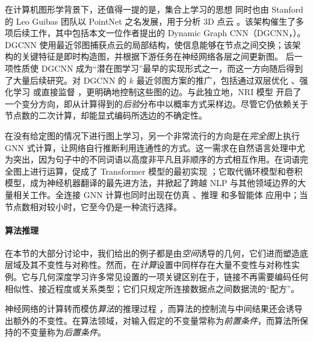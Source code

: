 在计算机图形学背景下，还值得一提的是，集合上学习的思想 \citep{zaheer2017deep} 同时也由 Stanford 的 Leo Guibas 团队以 PointNet 之名发展，用于分析 3D 点云 \citep{qi2017pointnet}。该架构催生了多项后续工作，其中包括本文一位作者提出的 Dynamic Graph CNN（DGCNN，\cite{wang2019dynamic}）。DGCNN 使用最近邻图捕获点云的局部结构，使信息能够在节点之间交换；该架构的关键特征是即时构造图，并根据下游任务在神经网络各层之间更新图。
%
后一项性质使 DGCNN 成为“潜在图学习”最早的实现形式之一，而这一方向随后得到了大量后续研究。对 DGCNN 的 $k$ 最近邻图方案的推广，包括通过双层优化 \citep{franceschi2019learning}、强化学习 \citep{kazi2020differentiable} 或直接监督 \citep{velivckovic2020pointer}，更明确地控制这些图的边。与此独立地，NRI 模型 \citep{kipf2018neural} 开启了一个变分方向，即从计算得到的\emph{后验}分布中以概率方式采样边。尽管它仍依赖关于节点数的二次计算，却能显式编码所选边的不确定性。

在没有给定图的情况下进行图上学习，另一个非常流行的方向是在\emph{完全图}上执行 GNN 式计算，让网络自行推断利用连通性的方式。这一需求在自然语言处理中尤为突出，因为句子中的不同词语以高度非平凡且非顺序的方式相互作用。在词语完全图上进行运算，促成了 Transformer 模型的最初实现 \citep{vaswani2017attention}；它取代循环模型和卷积模型，成为神经机器翻译的最先进方法，并掀起了跨越 NLP 与其他领域边界的大量相关工作。全连接 GNN 计算也同时出现在仿真 \citep{battaglia2016interaction}、推理 \citep{santoro2017simple} 和多智能体 \citep{hoshen2017vain} 应用中；当节点数相对较小时，它至今仍是一种流行选择。
%



\paragraph{算法推理}
在本节的大部分讨论中，我们给出的例子都是由\emph{空间}诱导的几何，它们进而塑造底层域及其不变性与对称性。然而，在\emph{计算}设置中同样存在大量不变性与对称性实例。它与几何深度学习许多常见设置的一项关键区别在于，链接不再需要编码任何相似性、接近程度或关系类型；它们只规定所连接数据点之间数据流的“配方”。

神经网络的计算转而模仿\emph{算法}的推理过程 \citep{cormen2009introduction}，而算法的控制流与中间结果还会诱导出额外的不变性。在算法领域，对输入假定的不变量常称为\emph{前置条件}，而算法所保持的不变量称为\emph{后置条件}。

